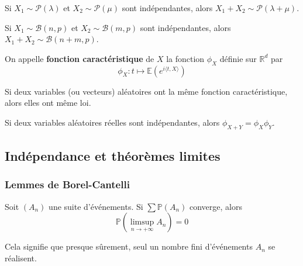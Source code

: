 	\begin{example}
		Si $X_1 \sim \mathcal{P}(\lambda)$ et $X_2 \sim \mathcal{P}(\mu)$ sont indépendantes, alors $X_1 + X_2 \sim \mathcal{P}(\lambda + \mu)$.
	\end{example}
	
	
	\begin{example}
		Si $X_1 \sim \mathcal{B}(n, p)$ et $X_2 \sim \mathcal{B}(m, p)$ sont indépendantes, alors $X_1 + X_2 \sim \mathcal{B}(n + m, p)$.
	\end{example}
	
	
	\begin{definition}
		On appelle \textbf{fonction caractéristique} de $X$ la fonction $\phi_X$ définie sur $\mathbb{R}^d$ par
		\[ \phi_X : t \mapsto \mathbb{E}\left( e^{i \langle t, X \rangle} \right) \]
	\end{definition}
	
	\begin{theorem}
		Si deux variables (ou vecteurs) aléatoires ont la même fonction caractéristique, alors elles ont même loi.
	\end{theorem}
	
	\begin{proposition}
		Si deux variables aléatoires réelles sont indépendantes, alors $\phi_{X+Y} = \phi_X \phi_Y$.
	\end{proposition}
	
	\subsection{Indépendance et théorèmes limites}
	
	\subsubsection{Lemmes de Borel-Cantelli}
	
	
	\begin{theorem}
		Soit $(A_n)$ une suite d'événements. Si $\sum \mathbb{P}(A_n)$ converge, alors
		\[ \mathbb{P} \left( \limsup_{n \rightarrow +\infty} A_n \right) = 0 \]
	\end{theorem}
	
	\begin{remark}
		Cela signifie que presque sûrement, seul un nombre fini d'événements $A_n$ se réalisent.
	\end{remark}
	
